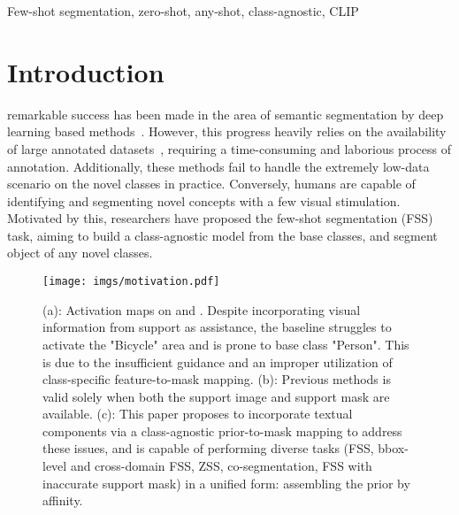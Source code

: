 \documentclass[lettersize,journal]{IEEEtran}
\begin{document}
 
\begin{IEEEkeywords}
  Few-shot segmentation, zero-shot, any-shot, class-agnostic, CLIP
\end{IEEEkeywords}


\section{Introduction}

 remarkable success has been made in the area of semantic segmentation by deep learning based methods~\cite{long2015fully,chen2017deeplab,cheng2021per,QiuYM18,9745353}. However, this progress heavily relies on the availability of large annotated datasets~\cite{lin2014microsoft,everingham2010pascal,zhou2019semantic}, requiring a time-consuming and laborious process of annotation. Additionally, these methods fail to handle the extremely low-data scenario on the novel classes in practice. Conversely, humans are capable of identifying and segmenting novel concepts with a few visual stimulation. Motivated by this, researchers have proposed the few-shot segmentation (FSS) task, aiming to build a class-agnostic model from the base classes, and segment object of any novel classes.

\begin{figure}[t]
    \centering
    \texttt{[image: imgs/motivation.pdf]}
    \caption{(a): Activation maps on   and . Despite incorporating visual information from support as assistance, the baseline struggles to activate the "Bicycle" area and is prone to base class "Person". This is due to the insufficient guidance and an improper utilization of class-specific feature-to-mask mapping. (b): Previous methods is valid solely when both the support image  and support mask  are available. (c): This paper proposes to incorporate textual components via a class-agnostic prior-to-mask mapping to address these issues, and is capable of performing diverse tasks (FSS, bbox-level and cross-domain FSS, ZSS, co-segmentation, FSS with inaccurate support mask) in a unified form: assembling the prior by affinity.}
    \label{fig:motivation}
  \end{figure}
\end{document}
